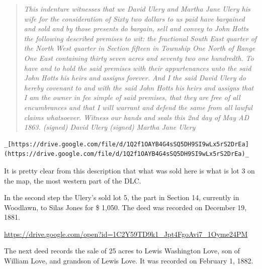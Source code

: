 \documentclass[
  12pt,
]{book}
\begin{document}
\begin{quote}
\emph{This indenture witnesses that we David Ulery and Martha Jane Ulery his wife for the consideration of Sixty two dollars to us paid have bargained and sold and by those presents do bargain, sell and convey to John Hotts the following described premises to wit: the fractional South East quarter of the North West quarter in Section fifteen in Township One North of Range One East containing thirty seven acres and seventy two one hundredth. To have and to hold the said premises with their appurtenances unto the said John Hotts his heirs and assigns forever. And I the said David Ulery do hereby covenant to and with the said John Hotts his heirs and assigns that I am the owner in fee simple of said premises, that they are free of all encumbrances and that I will warrant and defend the same from all lawful claims whatsoever. Witness our hands and seals this 2nd day of May AD 1863. (signed) David Ulery (signed) Martha Jane Ulery}
\end{quote}

\begin{verbatim}
_[https://drive.google.com/file/d/1Q2f1OAYB4G4sSQ5DH9SI9wLx5rS2DrEa](https://drive.google.com/file/d/1Q2f1OAYB4G4sSQ5DH9SI9wLx5rS2DrEa)_
\end{verbatim}

It is pretty clear from this description that what was sold here is what is lot 3 on the map, the most western part of the DLC.

In the second step the Ulery's sold lot 5, the part in Section 14, currently in Woodlawn, to Silas Jones for \$ 1,050. The deed was recorded on December 19, 1881.

\url{https://drive.google.com/open?id=1C2Y59TD9k1_Jpt4FgoAvi7_1Oyme24PM}

The next deed records the sale of 25 acres to Lewis Washington Love, son of William Love, and grandson of Lewis Love. It was recorded on February 1, 1882.
\end{document}
